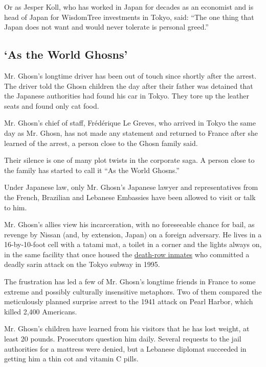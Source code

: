 Or as Jesper Koll, who has worked in Japan for decades as an economist
and is head of Japan for WisdomTree investments in Tokyo, said: ``The
one thing that Japan does not want and would never tolerate is personal
greed.''

\hypertarget{as-the-world-ghosns}{%
\subsection{`As the World Ghosns'}\label{as-the-world-ghosns}}

Mr. Ghosn's longtime driver has been out of touch since shortly after
the arrest. The driver told the Ghosn children the day after their
father was detained that the Japanese authorities had found his car in
Tokyo. They tore up the leather seats and found only cat food.

Mr. Ghosn's chief of staff, Frédérique Le Greves, who arrived in Tokyo
the same day as Mr. Ghosn, has not made any statement and returned to
France after she learned of the arrest, a person close to the Ghosn
family said.

Their silence is one of many plot twists in the corporate saga. A person
close to the family has started to call it ``As the World Ghosns.''

Under Japanese law, only Mr. Ghosn's Japanese lawyer and representatives
from the French, Brazilian and Lebanese Embassies have been allowed to
visit or talk to him.

Mr. Ghosn's allies view his incarceration, with no foreseeable chance
for bail, as revenge by Nissan (and, by extension, Japan) on a foreign
adversary. He lives in a 16-by-10-foot cell with a tatami mat, a toilet
in a corner and the lights always on, in the same facility that once
housed the
\href{https://www.autonews.com/article/20181122/COPY01/311229975/ghosn-said-to-be-held-in-cold-detention-cell-as-misconduct-allegations-are-investigated}{death-row
inmates} who committed a deadly sarin attack on the Tokyo subway in
1995.

The frustration has led a few of Mr. Ghosn's longtime friends in France
to some extreme and possibly culturally insensitive metaphors. Two of
them compared the meticulously planned surprise arrest to the 1941
attack on Pearl Harbor, which killed 2,400 Americans.

Mr. Ghosn's children have learned from his visitors that he has lost
weight, at least 20 pounds. Prosecutors question him daily. Several
requests to the jail authorities for a mattress were denied, but a
Lebanese diplomat succeeded in getting him a thin cot and vitamin C
pills.

